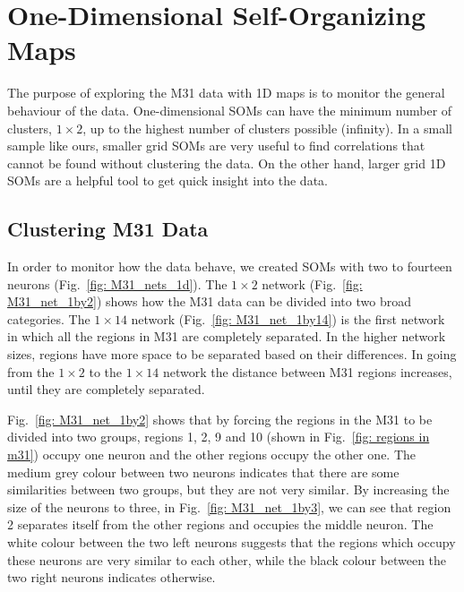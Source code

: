 \section{One-Dimensional Self-Organizing Maps}
    \label{Sec: 1d_cluster}
    The purpose of exploring the M31 data with 1D maps is to monitor the general behaviour of the data. 
    One-dimensional SOMs can have the minimum number of clusters, $1\times2$, up to the highest number of clusters possible (infinity). %
    In a small sample like ours, smaller grid SOMs are very useful to find correlations that cannot be found without clustering the data.
    On the other hand, larger grid 1D SOMs are a helpful tool to get quick insight into the data.

    \subsection{Clustering M31 Data}

        In order to monitor how the data behave, we created SOMs with two to fourteen neurons (Fig.~\ref{fig: M31_nets_1d}).
        The $1\times2$ network (Fig.~\ref{fig: M31_net_1by2}) shows how the M31 data can be divided into two broad categories.
        The $1\times14$ network (Fig.~\ref{fig: M31_net_1by14}) is the first network in which all the regions in M31 are completely separated.
        In the higher network sizes, regions have more space to be separated based on their differences. In going from the $1\times2$ to the $1\times14$ network the distance between M31 regions increases, until they are completely separated. 
        
        Fig.~\ref{fig: M31_net_1by2} shows that by forcing the regions in the M31 to be divided into two groups, regions 1, 2, 9 and 10 (shown in Fig.~\ref{fig: regions in m31}) occupy one neuron and the other regions occupy the other one.
        The medium grey colour between two neurons indicates that there are some similarities between two groups, but they are not very similar. 
        By increasing the size of the neurons to three, in Fig.~\ref{fig: M31_net_1by3}, we can see that region 2 separates itself from the other regions and occupies the middle neuron.
        The white colour between the two left neurons suggests that the regions which occupy these neurons are very similar to each other, while the black colour between the two right neurons indicates otherwise.
        
